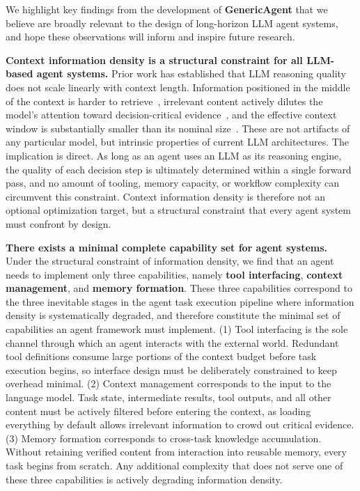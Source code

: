 We highlight key findings from the development of \textbf{GenericAgent} that we believe are broadly relevant to the design of long-horizon LLM agent systems, and hope these observations will inform and inspire future research.

\textbf{Context information density is a structural constraint for all 
LLM-based agent systems.} Prior work has established that LLM reasoning 
quality does not scale linearly with context length. Information positioned 
in the middle of the context is harder to retrieve~\cite{lost_in_middle}, 
irrelevant content actively dilutes the model's attention toward 
decision-critical evidence~\cite{lost_in_middle, multi_turn_lost}, 
and the effective context window is substantially smaller than its nominal 
size~\cite{anthropic_context}. These are not artifacts of any 
particular model, but intrinsic properties of current LLM architectures. 
The implication is direct. As long as an agent uses an LLM as its reasoning 
engine, the quality of each decision step is ultimately determined within a 
single forward pass, and no amount of tooling, memory capacity, or workflow 
complexity can circumvent this constraint. Context information density is 
therefore not an optional optimization target, but a structural constraint 
that every agent system must confront by design.

\textbf{There exists a minimal complete capability set for agent systems.} 
Under the structural constraint of information density, we find that an 
agent needs to implement only three capabilities, namely \textbf{tool 
interfacing}, \textbf{context management}, and \textbf{memory formation}. 
These three capabilities correspond to the three inevitable stages in the 
agent task execution pipeline where information density is systematically 
degraded, and therefore constitute the minimal set of capabilities an agent 
framework must implement. (1) Tool interfacing is the sole channel through 
which an agent interacts with the external world. Redundant tool definitions 
consume large portions of the context budget before task execution begins, 
so interface design must be deliberately constrained to keep overhead 
minimal. (2) Context management corresponds to the input to the language 
model. Task state, intermediate results, tool outputs, and all other content 
must be actively filtered before entering the context, as loading everything 
by default allows irrelevant information to crowd out critical evidence. 
(3) Memory formation corresponds to cross-task knowledge accumulation. 
Without retaining verified content from interaction into reusable memory, 
every task begins from scratch. Any additional complexity that does not 
serve one of these three capabilities is actively degrading information 
density.


